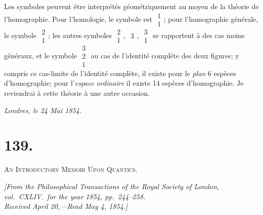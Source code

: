 \documentclass[11pt,a4paper]{book}
\begin{document}
\newpage
\setcounter{page}{220}

Les symboles peuvent \^{e}tre interpr\'{e}t\'{e}s g\'{e}om\'{e}triquement au moyen de la th\'{e}orie de l'homographie. Pour l'homologie, le symbole est $\begin{array}{c} 1 \\ 1 \end{array}$; pour l'homographie g\'{e}n\'{e}rale, le symbole $\begin{array}{c} 2 \\ 1 \end{array}$; les autres symboles $\begin{array}{c} 2 \\ 1 \end{array}$, $\begin{array}{c} 3 \end{array}$, $\begin{array}{c} 3 \\ 1 \end{array}$ se rapportent \`{a} des cas moins g\'{e}n\'{e}raux, et le symbole $\begin{array}{c} 3 \\ 2 \\ 1 \end{array}$ au cas de l'identit\'{e} compl\`{e}te des deux figures; y compris ce cas-limite de l'identit\'{e} compl\`{e}te, il existe pour le \textit{plan} 6 esp\`{e}ces d'homographie; pour l'\textit{espace ordinaire} il existe 14 esp\`{e}ces d'homographie. Je reviendrai \`{a} cette th\'{e}orie \`{a} une autre occasion.

\begin{flushright}
\textit{Londres, le 24 Mai 1854.}
\end{flushright}

\newpage
\setcounter{page}{221}


\section*{139.}

\textsc{An Introductory Memoir Upon Quantics.}

\begin{flushright}
\textit{[From the Philosophical Transactions of the Royal Society of London,}\\
\textit{vol.\ CXLIV.\ for the year 1854, pp.\ 244--258.}\\
\textit{Received April 20,---Read May 4, 1854.]}
\end{flushright}
\end{document}
